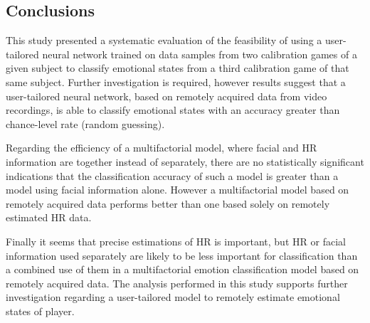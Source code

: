 
\subsection{Conclusions}

This study presented a systematic evaluation of the feasibility of using a user-tailored neural network trained on data samples from two calibration games of a given subject to classify emotional states from a third calibration game of that same subject. Further investigation is required, however results suggest that a user-tailored neural network, based on remotely acquired data from video recordings, is able to classify emotional states with an accuracy greater than chance-level rate (random guessing).

Regarding the efficiency of a multifactorial model, where facial and HR information are together instead of separately, there are no statistically significant indications that the classification accuracy of such a model is greater than a model using facial information alone. However a multifactorial model based on remotely acquired data performs better than one based solely on remotely estimated HR data.

Finally it seems that precise estimations of HR is important, but HR or facial information used separately are likely to be less important for classification than a combined use of them in a multifactorial emotion classification model based on remotely acquired data. The analysis performed in this study supports further investigation regarding a user-tailored model to remotely estimate emotional states of player.
